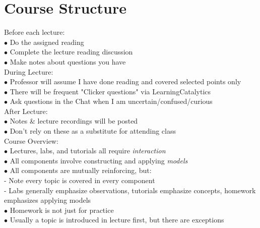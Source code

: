 \section{Course Structure}

    Before each lecture: \\
    $\bullet$ Do the assigned reading \\
    $\bullet$ Complete the lecture reading discussion \\
    $\bullet$ Make notes about questions you have \\

    \noindent During Lecture: \\
    $\bullet$ Professor will assume I have done reading and covered selected points only \\
    $\bullet$  There will be frequent "Clicker questions" via LearningCatalytics \\
    $\bullet$ Ask questions in the Chat when I am uncertain/confused/curious \\

    \noindent After Lecture: \\
    $\bullet$ Notes & lecture recordings will be posted \\
    $\bullet$ Don't rely on these as a substitute for attending class \\

    \noindent Course Overview: \\
    $\bullet$ Lectures, labs, and tutorials all require \textit{interaction} \\
    $\bullet$ All components involve constructing and applying \textit{models} \\
    $\bullet$ All components are mutually reinforcing, but: \\
    - Note every topic is covered in every component \\
    - Labs generally emphasize observations, tutorials emphasize concepts, homework emphasizes applying models \\
    $\bullet$ Homework is not just for practice \\
    $\bullet$ Usually a topic is introduced in lecture first, but there are exceptions \\

